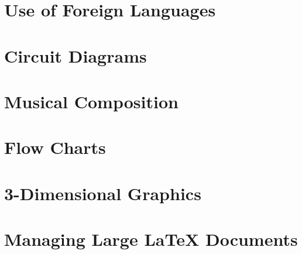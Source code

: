 \section{Use of Foreign Languages}


\section{Circuit Diagrams}


\section{Musical Composition}


\section{Flow Charts}


\section{3-Dimensional Graphics}


\section{Managing Large \LaTeX{} Documents}